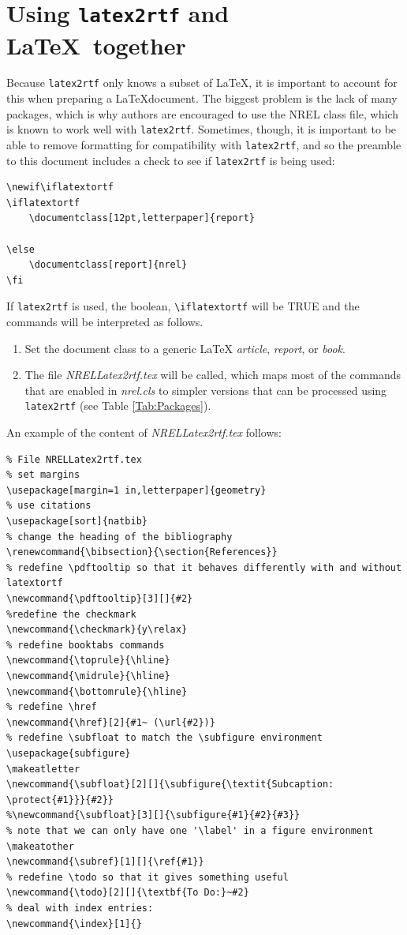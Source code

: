 \documentclass[12pt,letterpaper]{report}
\begin{document}
\section{Using \texttt{latex2rtf} and \LaTeX\ together}
Because \texttt{latex2rtf} only knows a subset of \LaTeX, it is important to account for this when preparing a \LaTeX document. The biggest problem is the lack of many packages, which is why authors are encouraged to use the NREL class file, which is known to work well with \texttt{latex2rtf}. Sometimes, though, it is important to be able to remove formatting for compatibility with \texttt{latex2rtf}, and so the preamble to this document includes a check to see if \texttt{latex2rtf} is being used:

\begin{verbatim}
\newif\iflatextortf
\iflatextortf
	\documentclass[12pt,letterpaper]{report}
	
\else
	\documentclass[report]{nrel} 
\fi
\end{verbatim}

If \texttt{latex2rtf} is used, the boolean, \texttt{\textbackslash iflatextortf} will be TRUE and the commands will be interpreted as follows.
\begin{enumerate}
\item Set the document class to a generic \LaTeX{} \emph{article}, \emph{report}, or \emph{book}. 
\item The file \emph{NRELLatex2rtf.tex} will be called, which maps most of the commands that are enabled in \emph{nrel.cls} to simpler versions that can be processed using \texttt{latex2rtf} (see Table \ref{Tab:Packages}).
\end{enumerate}

An example of the content of \emph{NRELLatex2rtf.tex} follows:

\begin{verbatim}
% File NRELLatex2rtf.tex
% set margins
\usepackage[margin=1 in,letterpaper]{geometry}
% use citations
\usepackage[sort]{natbib}
% change the heading of the bibliography
\renewcommand{\bibsection}{\section{References}}
% redefine \pdftooltip so that it behaves differently with and without latextortf
\newcommand{\pdftooltip}[3][]{#2}
%redefine the checkmark
\newcommand{\checkmark}{y\relax}
% redefine booktabs commands
\newcommand{\toprule}{\hline}
\newcommand{\midrule}{\hline}
\newcommand{\bottomrule}{\hline}
% redefine \href
\newcommand{\href}[2]{#1~ (\url{#2})}
% redefine \subfloat to match the \subfigure environment
\usepackage{subfigure}
\makeatletter
\newcommand{\subfloat}[2][]{\subfigure{\textit{Subcaption: \protect{#1}}}{#2}}
%\newcommand{\subfloat}[3][]{\subfigure{#1}{#2}{#3}}
% note that we can only have one '\label' in a figure environment
\makeatother
\newcommand{\subref}[1][]{\ref{#1}}
% redefine \todo so that it gives something useful
\newcommand{\todo}[2][]{\textbf{To Do:}~#2}
% deal with index entries:
\newcommand{\index}[1]{}
\end{verbatim}
\end{document}
